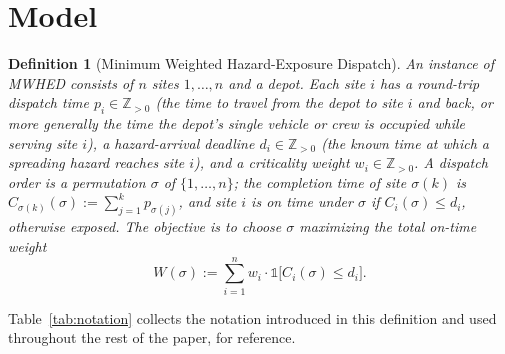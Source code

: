 \documentclass[pdflatex,sn-mathphys-ay]{sn-jnl}
\theoremstyle{thmstyleone}
\theoremstyle{thmstyletwo}
\newtheorem{definition}{Definition}
\theoremstyle{thmstylethree}
\begin{document}
\section{Model}\label{sec:model}

\begin{definition}[Minimum Weighted Hazard-Exposure Dispatch]\label{def:mwhed}
An instance of MWHED consists of $n$ sites $1,\dots,n$ and a depot. Each
site $i$ has a round-trip dispatch time $p_i \in \mathbb Z_{>0}$ (the
time to travel from the depot to site $i$ and back, or more generally
the time the depot's single vehicle or crew is occupied while serving
site $i$), a hazard-arrival deadline $d_i \in \mathbb Z_{>0}$ (the known
time at which a spreading hazard reaches site $i$), and a criticality
weight $w_i \in \mathbb Z_{>0}$. A \emph{dispatch order} is a
permutation $\sigma$ of $\{1,\dots,n\}$; the \emph{completion time} of
site $\sigma(k)$ is $C_{\sigma(k)}(\sigma) := \sum_{j=1}^k
p_{\sigma(j)}$, and site $i$ is \emph{on time} under $\sigma$ if $C_i(\sigma)
\le d_i$, otherwise \emph{exposed}. The objective is to choose $\sigma$
maximizing the total on-time weight
\begin{equation}\label{eq:objective}
W(\sigma) := \sum_{i=1}^n w_i \cdot \mathbb 1\bigl[C_i(\sigma) \le
d_i\bigr].
\end{equation}
\end{definition}

Table~\ref{tab:notation} collects the notation introduced in this
definition and used throughout the rest of the paper, for reference.
\end{document}
